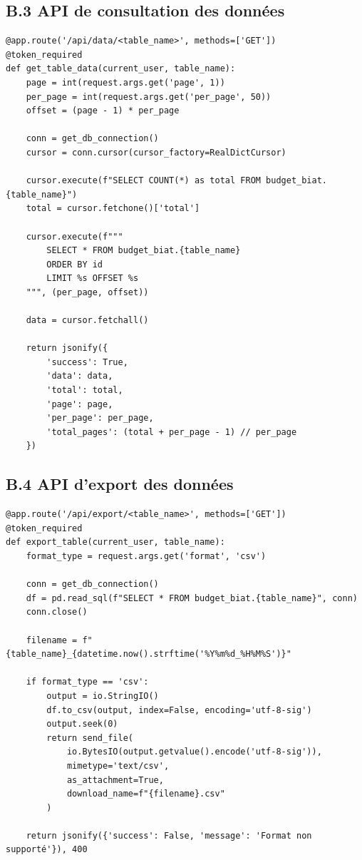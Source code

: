 \subsection*{B.3 API de consultation des données}

\begin{verbatim}
@app.route('/api/data/<table_name>', methods=['GET'])
@token_required
def get_table_data(current_user, table_name):
    page = int(request.args.get('page', 1))
    per_page = int(request.args.get('per_page', 50))
    offset = (page - 1) * per_page
    
    conn = get_db_connection()
    cursor = conn.cursor(cursor_factory=RealDictCursor)
    
    cursor.execute(f"SELECT COUNT(*) as total FROM budget_biat.{table_name}")
    total = cursor.fetchone()['total']
    
    cursor.execute(f"""
        SELECT * FROM budget_biat.{table_name}
        ORDER BY id
        LIMIT %s OFFSET %s
    """, (per_page, offset))
    
    data = cursor.fetchall()
    
    return jsonify({
        'success': True,
        'data': data,
        'total': total,
        'page': page,
        'per_page': per_page,
        'total_pages': (total + per_page - 1) // per_page
    })
\end{verbatim}

\subsection*{B.4 API d'export des données}

\begin{verbatim}
@app.route('/api/export/<table_name>', methods=['GET'])
@token_required
def export_table(current_user, table_name):
    format_type = request.args.get('format', 'csv')
    
    conn = get_db_connection()
    df = pd.read_sql(f"SELECT * FROM budget_biat.{table_name}", conn)
    conn.close()
    
    filename = f"{table_name}_{datetime.now().strftime('%Y%m%d_%H%M%S')}"
    
    if format_type == 'csv':
        output = io.StringIO()
        df.to_csv(output, index=False, encoding='utf-8-sig')
        output.seek(0)
        return send_file(
            io.BytesIO(output.getvalue().encode('utf-8-sig')),
            mimetype='text/csv',
            as_attachment=True,
            download_name=f"{filename}.csv"
        )
    
    return jsonify({'success': False, 'message': 'Format non supporté'}), 400
\end{verbatim}

